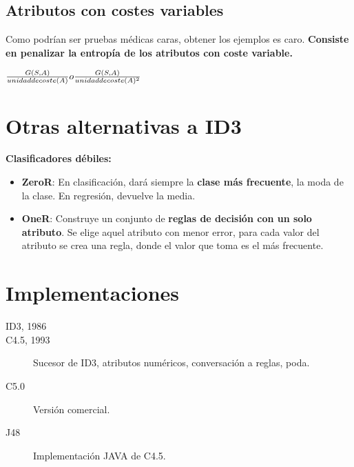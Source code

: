 \documentclass[12pt, twoside, openright]{report} %
\begin{document}
\subsection{Atributos con costes
	variables}

Como podrían ser pruebas médicas caras, obtener los ejemplos es caro.
\textbf{Consiste en penalizar la entropía de los atributos con coste
	variable.}

\(\frac {G(S, A)}{unidad \space de \space coste(A)} o \frac {G(S, A)}{unidad \space de \space coste(A)^2}\)

\section{Otras alternativas a ID3}

\textbf{Clasificadores débiles:}

\begin{itemize}
	\item \textbf{ZeroR}: En clasificación, dará siempre la \textbf{clase más
		      frecuente}, la moda de la clase. En regresión, devuelve la media.
	\item \textbf{OneR}: Construye un conjunto de \textbf{reglas de decisión con
		      un solo atributo}. Se elige aquel atributo con menor error, para cada
	      valor del atributo se crea una regla, donde el valor que toma es el
	      más frecuente.
\end{itemize}

\section{Implementaciones}

\begin{description}
	\item[ID3, 1986]
	\item[C4.5, 1993] Sucesor de ID3, atributos numéricos, conversación a reglas, poda.
	\item[C5.0] Versión comercial.
	\item[J48] Implementación JAVA de C4.5.
\end{description}
\end{document}
